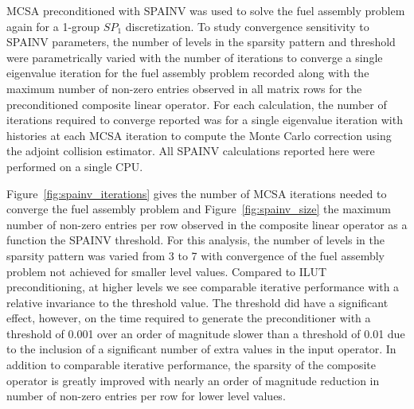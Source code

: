 MCSA preconditioned with SPAINV was used to solve the fuel assembly
problem again for a 1-group $SP_1$ discretization. To study
convergence sensitivity to SPAINV parameters, the number of levels in
the sparsity pattern and threshold were parametrically varied with the
number of iterations to converge a single eigenvalue iteration for the
fuel assembly problem recorded along with the maximum number of
non-zero entries observed in all matrix rows for the preconditioned
composite linear operator. For each calculation, the number of
iterations required to converge reported was for a single eigenvalue
iteration with  histories at each MCSA iteration to compute
the Monte Carlo correction using the adjoint collision estimator. All
SPAINV calculations reported here were performed on a single CPU.

Figure~\ref{fig:spainv_iterations} gives the number of MCSA iterations
needed to converge the fuel assembly problem and
Figure~\ref{fig:spainv_size} the maximum number of non-zero entries
per row observed in the composite linear operator as a function the
SPAINV threshold. For this analysis, the number of levels in the
sparsity pattern was varied from 3 to 7 with convergence of the fuel
assembly problem not achieved for smaller level values. Compared to
ILUT preconditioning, at higher levels we see comparable iterative
performance with a relative invariance to the threshold value. The
threshold did have a significant effect, however, on the time required
to generate the preconditioner with a threshold of 0.001 over an order
of magnitude slower than a threshold of 0.01 due to the inclusion of a
significant number of extra values in the input operator. In addition
to comparable iterative performance, the sparsity of the composite
operator is greatly improved with nearly an order of magnitude
reduction in number of non-zero entries per row for lower level
values.

